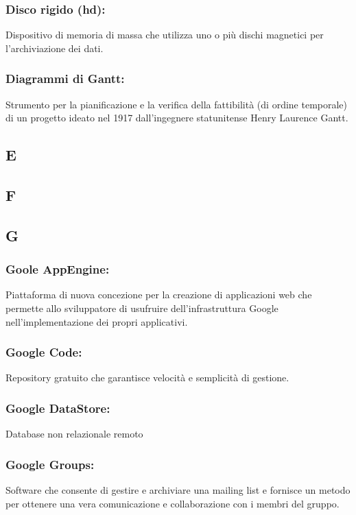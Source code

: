 \subsubsection*{Disco rigido (hd):} Dispositivo di memoria di massa che utilizza
uno o pi\`u dischi magnetici per l'archiviazione dei dati.

\subsubsection*{Diagrammi di Gantt:} Strumento per la pianificazione e la
verifica della fattibilit\`a (di ordine temporale) di un progetto ideato nel 1917 dall'ingegnere
statunitense Henry Laurence Gantt.
\subsection*{\huge{E}}
\subsection*{\huge{F}}
\subsection*{\huge{G}}

\subsubsection*{Goole AppEngine:} Piattaforma di nuova concezione per
la creazione di applicazioni web che permette allo sviluppatore di usufruire dell'infrastruttura
Google nell'implementazione dei propri applicativi.

\subsubsection*{Google Code:} Repository gratuito che garantisce
velocit\`a e semplicit\`a di gestione.

\subsubsection*{Google DataStore:} Database non relazionale remoto

\subsubsection*{Google Groups:} Software che consente di gestire e archiviare
una mailing list e fornisce un metodo per ottenere una vera comunicazione e
collaborazione con i membri del gruppo.

